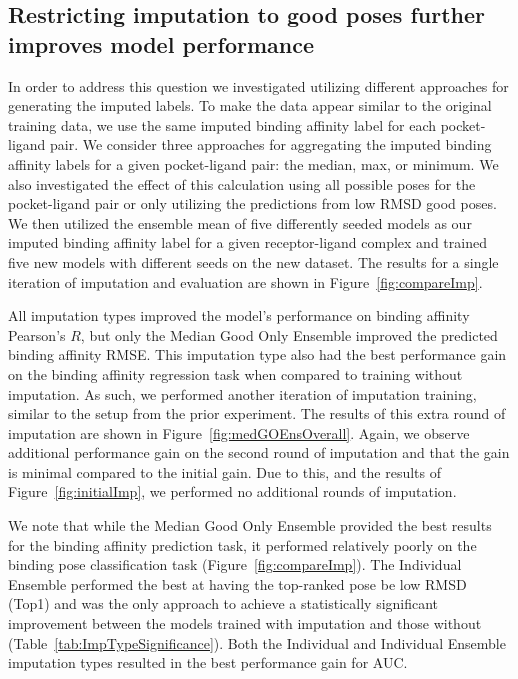 \documentclass[journal=jcim,manuscript=article]{achemso}
\begin{document}
\subsection{Restricting imputation to good poses further improves model performance}
In order to address this question we investigated utilizing different approaches for generating the imputed labels.
To make the data appear similar to the original training data, we use the same imputed binding affinity label for each pocket-ligand pair.
We consider three approaches for aggregating the imputed binding affinity labels for a given pocket-ligand pair: the median, max, or minimum.
We also investigated the effect of this calculation using all possible poses for the pocket-ligand pair or only utilizing the predictions from low RMSD good poses.
We then utilized the ensemble mean of five differently seeded models as our imputed binding affinity label for a given receptor-ligand complex and trained five new models with different seeds on the new dataset.
The results for a single iteration of imputation and evaluation are shown in Figure~\ref{fig:compareImp}.

All imputation types improved the model's performance on binding affinity Pearson's $R$, but only the Median Good Only Ensemble improved the predicted binding affinity RMSE.
This imputation type also had the best performance gain on the binding affinity regression task when compared to training without imputation.
As such, we performed another iteration of imputation training, similar to the setup from the prior experiment.
The results of this extra round of imputation are shown in Figure~\ref{fig:medGOEnsOverall}.
Again, we observe additional performance gain on the second round of imputation and that the gain is minimal compared to the initial gain.
Due to this, and the results of Figure~\ref{fig:initialImp}, we performed no additional rounds of imputation.

We note that while the Median Good Only Ensemble provided the best results for the binding affinity prediction task, it performed relatively poorly on the binding pose classification task (Figure~\ref{fig:compareImp}).
The Individual Ensemble performed the best at having the top-ranked pose be low RMSD (Top1) and was the only approach to achieve a statistically significant improvement between the models trained with imputation and those without (Table~\ref{tab:ImpTypeSignificance}).
Both the Individual and Individual Ensemble imputation types resulted in the best performance gain for AUC.
\end{document}
